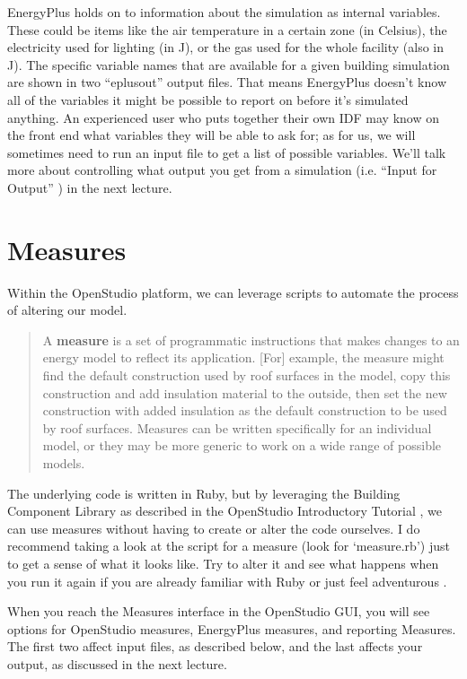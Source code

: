 \documentclass[10pt]{article}
\begin{document}
EnergyPlus holds on to information about the simulation as internal variables. These could be items like the air temperature in a certain zone (in Celsius), the electricity used for lighting (in J), or the gas used for the whole facility (also in J). The specific variable names that are available for a given building simulation are shown in two ``eplusout'' output files. That means EnergyPlus doesn't know all of the variables it might be possible to report on before it's simulated anything. An experienced user who puts together their own IDF may know on the front end what variables they will be able to ask for; as for us, we will sometimes need to run an input file to get a list of possible variables. We'll talk more about controlling what output you get from a simulation (i.e. ``Input for Output'' \cite{EP9docs}) in the next lecture.

\section{Measures}

Within the OpenStudio platform, we can leverage scripts to automate the process of altering our model. 

\begin{quote}
    A \textbf{measure} is a set of programmatic instructions that makes changes to an energy model to reflect its application. [For] example, the measure might find the default construction used by roof surfaces in the model, copy this construction and add insulation material to the outside, then set the new construction with added insulation as the default construction to be used by roof surfaces. Measures can be written specifically for an individual model, or they may be more generic to work on a wide range of possible models. \cite{noauthor_undated-ve}
\end{quote}

The underlying code is written in Ruby, but by leveraging the Building Component Library \cite{BCL} as described in the OpenStudio Introductory Tutorial \cite{noauthor_undated-fr}, we can use measures without having to create or alter the code ourselves. I do recommend taking a look at the script for a measure (look for `measure.rb') just to get a sense of what it looks like. Try to alter it and see what happens when you run it again if you are already familiar with Ruby or just feel adventurous \cite{Smith2018-vw}.

When you reach the Measures interface in the OpenStudio GUI, you will see options for OpenStudio measures, EnergyPlus measures, and reporting Measures. The first two affect input files, as described below, and the last affects your output, as discussed in the next lecture.
\end{document}
